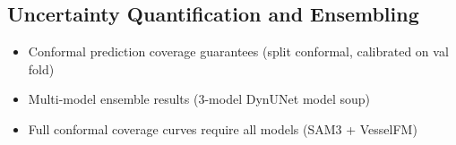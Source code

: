 
\subsection{Uncertainty Quantification and Ensembling}

\begin{itemize}
  \item[PARTIAL] Conformal prediction coverage guarantees (split conformal, calibrated on val fold)
  \item[PARTIAL] Multi-model ensemble results (3-model DynUNet model soup)
  \item[PENDING] Full conformal coverage curves require all models (SAM3 + VesselFM)
\end{itemize}

